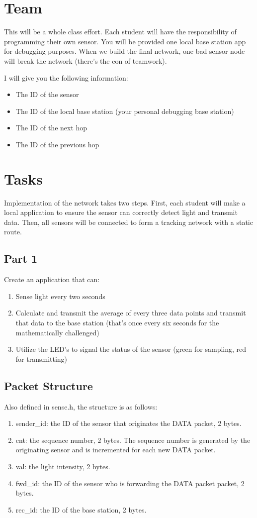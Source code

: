 \documentclass[letterpaper,12pt]{article}
\begin{document}
\section*{Team}
This will be a whole class effort. Each student will have the responsibility of programming their
own sensor. You will be provided one local base station app for debugging purposes. When we build
the final network, one bad sensor node will break the network (there's the con of teamwork).

I will give you the following information:
\begin{itemize}
    \item The ID of the sensor
    \item The ID of the local base station (your personal debugging base station)
    \item The ID of the next hop
    \item The ID of the previous hop
\end{itemize}

\section*{Tasks}
Implementation of the network takes two steps. First, each student will make a
local application to ensure the sensor can correctly detect light and transmit
data. Then, all sensors will be connected to form a tracking network with a static route.

\subsection*{Part 1}
Create an application that can:
\begin{enumerate}
    \item Sense light every two seconds
    \item Calculate and transmit the average of every three data points and transmit
        that data to the base station (that's once every six seconds for the mathematically
        challenged)
    \item Utilize the LED's to signal the status of the sensor (green for sampling,
        red for transmitting)
\end{enumerate}

\subsection*{Packet Structure}
Also defined in sense.h, the structure is as follows:
\begin{enumerate}
    \item sender\_id: the ID of the sensor that originates the DATA packet, 2 bytes.
    \item cnt: the sequence number, 2 bytes. The sequence number is generated by the
        originating sensor and is incremented for each new DATA packet.
    \item val: the light intensity, 2 bytes.
    \item fwd\_id: the ID of the sensor who is forwarding the DATA packet packet, 2 bytes.
    \item rec\_id: the ID of the base station, 2 bytes.
\end{enumerate}
\end{document}
